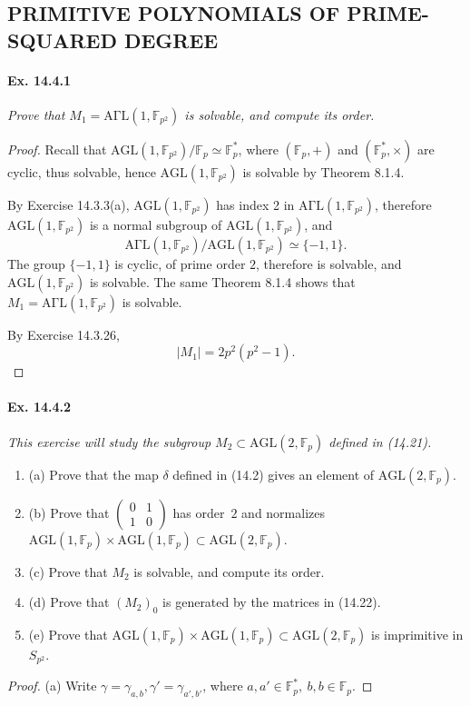 \documentclass[11pt,a4paper]{article}
\newcommand{\be} {\begin{enumerate}}
\newcommand{\ee} {\end{enumerate}}
\newcommand{\F}{\mathbb{F}}
\begin{document}
{\subsection{PRIMITIVE POLYNOMIALS OF PRIME-SQUARED DEGREE}
\paragraph{Ex. 14.4.1}{\it Prove that $M_1 = \mathrm{A\Gamma L}(1,\F_{p^2})$ is solvable, and compute its order.
}
\begin{proof}
Recall that $\mathrm{AGL}(1,\F_{p^2})/\F_p \simeq \F_p^*$, where $(\F_p,+)$ and $(\F_p^*,\times)$ are cyclic, thus solvable, hence $\mathrm{AGL}(1,\F_{p^2})$ is solvable by Theorem 8.1.4.

By Exercise 14.3.3(a), $\mathrm{AGL}(1,\F_{p^2})$ has index 2 in  $\mathrm{A\Gamma L}(1,\F_{p^2})$, therefore $\mathrm{AGL}(1,\F_{p^2})$ is a normal subgroup of $\mathrm{AGL}(1,\F_{p^2})$, and
$$\mathrm{A\Gamma L}(1,\F_{p^2})/  \mathrm{AGL}(1,\F_{p^2}) \simeq \{-1,1\}.$$
The group $ \{-1,1\}$ is cyclic, of prime order $2$, therefore is solvable, and $\mathrm{AGL}(1,\F_{p^2})$ is solvable. The same Theorem 8.1.4 shows that $M_1 = \mathrm{A\Gamma L}(1,\F_{p^2})$ is solvable.

By Exercise 14.3.26,
$$| M_1| = 2p^2(p^2-1).$$
\end{proof}

\paragraph{Ex. 14.4.2}{\it This exercise will study the subgroup $M_2 \subset \mathrm{AGL}(2,\F_p)$ defined in (14.21).
\be
\item[(a)] Prove that the map $\delta$ defined in (14.2) gives an element of $\mathrm{AGL}(2,\F_p)$.
\item[(b)] Prove that
$\begin{pmatrix}
0 & 1\\
1 & 0
\end{pmatrix}
$
has order $\,2$ and normalizes $\mathrm{AGL}(1,\F_p) \times \mathrm{AGL}(1,\F_p) \subset \mathrm{AGL}(2,\F_p)$.
\item[(c)] Prove that $M_2$ is solvable, and compute its order.
\item[(d)] Prove that $(M_2)_0$ is generated by the matrices in (14.22).
\item[(e)] Prove that $\mathrm{AGL}(1,\F_p) \times \mathrm{AGL}(1,\F_p) \subset \mathrm{AGL}(2,\F_p)$ is imprimitive in $S_{p^2}$.
\ee
}
\begin{proof}
\item[(a)] Write $\gamma = \gamma_{a,b}, \gamma' = \gamma_{a',b'}$, where $a,a'\in \F_p^*,\ b,b \in \F_p$.


\end{proof}}
\end{document}
